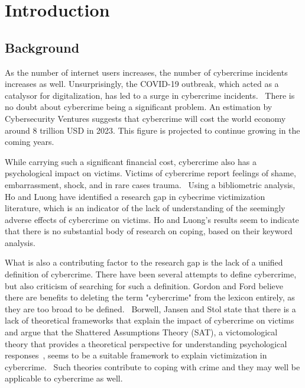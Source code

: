 \documentclass[12pt,english,titlepage,a4paper]{article}
\begin{document}

\tableofcontents
\pagebreak


\section{Introduction}

\subsection{Background}

As the number of internet users increases, the number of cybercrime incidents increases as well. Unsurprisingly, the COVID-19 outbreak, which acted as a catalysor for digitalization, has led to a surge in cybercrime incidents.~\citep{Monteith2021Increasing} There is no doubt about cybercrime being a significant problem. An estimation by Cybersecurity Ventures suggests that cybercrime will cost the world economy around 8 trillion USD in 2023. This figure is projected to continue growing in the coming years.~\citep{cybersecurity-ventures-cybercrime-report}

While carrying such a significant financial cost, cybercrime also has a psychological impact on victims. Victims of cybercrime report feelings of shame, embarrassment, shock, and in rare cases trauma.~\citep{jansen2018coping} Using a bibliometric analysis, Ho and Luong have identified a research gap in cybecrime victimization literature, which is an indicator of the lack of understanding of the seemingly adverse effects of cybercrime on victims. Ho and Luong's results seem to indicate that there is no substantial body of research on coping, based on their keyword analysis.~\citep{horesearch}

What is also a contributing factor to the research gap is the lack of a unified definition of cybercrime. There have been several attempts to define cybercrime, but also criticism of searching for such a definition. Gordon and Ford believe there are benefits to deleting the term "cybercrime" from the lexicon entirely, as they are too broad to be defined.~\citep{gordon2006definition} Borwell, Jansen and Stol state that there is a lack of theoretical frameworks that explain the impact of cybercrime on victims and argue that the Shattered Assumptions Theory (SAT), a victomological theory that provides a theoretical perspective for understanding psychological responses~\citep{janoff1983theoretical}, seems to be a suitable framework to explain victimization in cybercrime.~\citep{borwell2022psychological} Such theories contribute to coping with crime and they may well be applicable to cybercrime as well.
\end{document}
